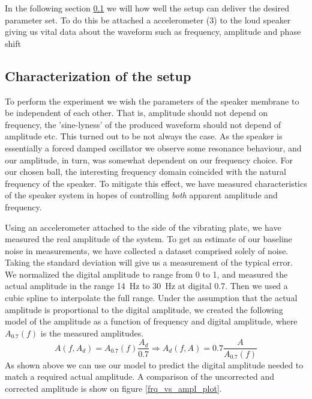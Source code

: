 \documentclass[12pt,oneside,a4paper]{article}
\numberwithin{equation}{section}
\begin{document}
{{{{In the following section \ref{Characterization} we will how well the setup can deliver the desired parameter set. To do this be attached a accelerometer (3) to the loud speaker giving us vital data about the waveform such as frequency, amplitude and phase shift 

\subsection{Characterization of the setup}
\label{Characterization}
To perform the experiment we wish the parameters of the speaker membrane to be independent of each other. That is, amplitude should not depend on frequency, the 'sine-lyness' of the produced waveform should not depend of amplitude etc. This turned out to be not always the case. As the speaker is essentially a forced damped oscillator we observe some resonance behaviour, and our amplitude, in turn, was somewhat dependent on our frequency choice. For our chosen ball, the interesting frequency domain coincided with the natural frequency of the speaker. To mitigate this effect, we have measured characteristics of the speaker system in hopes of controlling \emph{both} apparent amplitude and frequency.  

Using an accelerometer attached to the side of the vibrating plate, we have measured the real amplitude of the system. To get an estimate of our baseline noise in measurements, we have collected a dataset comprised solely of noise. Taking the standard deviation will give us a measurement of the typical error. We normalized the digital amplitude to range from 0 to 1, and measured the actual amplitude in the range \SI{14}{Hz} to \SI{30}{Hz} at digital 0.7. Then we used a cubic spline to interpolate the full range. Under the assumption that the actual amplitude is proportional to the digital amplitude, we created the following model of the amplitude as a function of frequency and digital amplitude, where $A_{0.7}(f)$ is the measured amplitudes.
\begin{equation}
	A(f,A_{d}) = A_{0.7}(f)\frac{A_{d}}{0.7} \Rightarrow A_d(f,A) = 0.7\frac{A}{A_{0.7}(f)}
	\label{ampl_model}
\end{equation}
As shown above we can use our model to predict the digital amplitude needed to match a required actual amplitude. A comparison of the uncorrected and corrected amplitude is show on figure \ref{frq_vs_ampl_plot}.

}}}}
\end{document}

